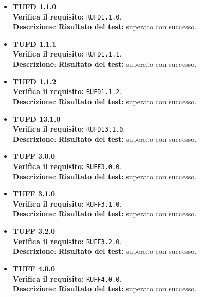 \begin{itemize}
\item \textbf{TUFD 1.1.0}\\
\textbf{Verifica il requisito:} \texttt{RUFD1.1.0}.\\
\textbf{Descrizione}: %
\textbf{Risultato del test:} superato con successo.

\item \textbf{TUFD 1.1.1}\\
\textbf{Verifica il requisito:} \texttt{RUFD1.1.1}.\\
\textbf{Descrizione}: %
\textbf{Risultato del test:} superato con successo.

\item \textbf{TUFD 1.1.2}\\
\textbf{Verifica il requisito:} \texttt{RUFD1.1.2}.\\
\textbf{Descrizione}: %
\textbf{Risultato del test:} superato con successo.

\item \textbf{TUFD 13.1.0}\\
\textbf{Verifica il requisito:} \texttt{RUFD13.1.0}.\\
\textbf{Descrizione}: %
\textbf{Risultato del test:} superato con successo.

\item \textbf{TUFF 3.0.0}\\
\textbf{Verifica il requisito:} \texttt{RUFF3.0.0}.\\
\textbf{Descrizione}: %
\textbf{Risultato del test:} superato con successo.

\item \textbf{TUFF 3.1.0}\\
\textbf{Verifica il requisito:} \texttt{RUFF3.1.0}.\\
\textbf{Descrizione}: %
\textbf{Risultato del test:} superato con successo.

\item \textbf{TUFF 3.2.0}\\
\textbf{Verifica il requisito:} \texttt{RUFF3.2.0}.\\
\textbf{Descrizione}: %
\textbf{Risultato del test:} superato con successo.

\item \textbf{TUFF 4.0.0}\\
\textbf{Verifica il requisito:} \texttt{RUFF4.0.0}.\\
\textbf{Descrizione}: %
\textbf{Risultato del test:} superato con successo.


\end{itemize}
